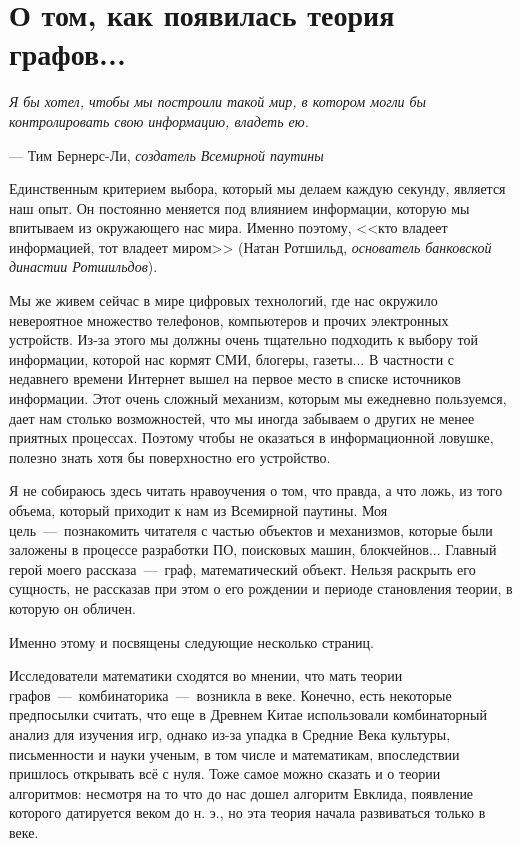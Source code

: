 \sloppy
\section{О том, как появилась теория графов...}


\epigraph{\itshape Я бы хотел, чтобы мы построили такой мир, 
в котором могли бы контролировать свою информацию, владеть ею.}
{--- Тим Бернерс-Ли, \textit{создатель Всемирной паутины}}

	Единственным критерием выбора, который мы делаем каждую секунду, является наш опыт. Он постоянно меняется под
	влиянием информации, которую мы впитываем из окружающего нас мира. Именно поэтому, <<кто владеет информацией, тот владеет миром>>
	(Натан Ротшильд, \emph{основатель банковской династии Ротшильдов}).
	
	Мы же живем сейчас в мире цифровых технологий, где нас окружило невероятное множество телефонов, компьютеров и прочих электронных устройств.
	Из-за этого мы должны очень тщательно подходить к выбору той информации, которой нас кормят СМИ, блогеры, газеты... В частности 
	с недавнего времени Интернет вышел на первое место в списке источников информации. Этот очень сложный механизм, которым мы ежедневно
	пользуемся, дает нам столько возможностей, что мы иногда забываем о других не менее приятных процессах. Поэтому чтобы не оказаться в
	информационной ловушке, полезно знать хотя бы поверхностно его устройство. 
	
	Я не собираюсь здесь читать нравоучения о том, что правда, а что ложь, из того объема, который приходит к нам из Всемирной паутины.
	Моя цель~---~познакомить читателя с частью объектов и механизмов, которые были заложены в процессе разработки ПО, поисковых машин,
	блокчейнов... Главный герой моего рассказа~---~граф, математический объект. Нельзя раскрыть его сущность, не рассказав при этом о
	его рождении и периоде становления теории, в которую он обличен.
	
	Именно этому и посвящены следующие несколько страниц.


	Исследователи математики сходятся во мнении, что мать теории графов~---~комбинаторика~---~возникла в  веке.
	Конечно, есть некоторые предпосылки считать, что еще в Древнем Китае использовали комбинаторный анализ для изучения игр, 
	однако из-за упадка в Средние Века культуры, письменности и науки ученым, в том числе и математикам, впоследствии пришлось 
	открывать всё с нуля. Тоже самое можно сказать и о теории алгоритмов: несмотря на то что до нас дошел алгоритм Евклида, 
	появление которого датируется  веком до н. э., но эта теория начала развиваться только в  веке.
	
